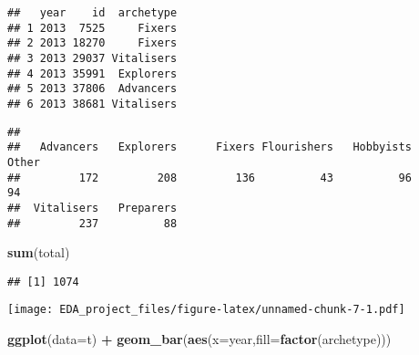 \documentclass[]{article}
\newenvironment{Shaded}{\begin{snugshade}}{\end{snugshade}}
\newcommand{\KeywordTok}[1]{\textcolor[rgb]{0.13,0.29,0.53}{\textbf{#1}}}
\newcommand{\DataTypeTok}[1]{\textcolor[rgb]{0.13,0.29,0.53}{#1}}
\newcommand{\StringTok}[1]{\textcolor[rgb]{0.31,0.60,0.02}{#1}}
\newcommand{\OperatorTok}[1]{\textcolor[rgb]{0.81,0.36,0.00}{\textbf{#1}}}
\newcommand{\NormalTok}[1]{#1}
\begin{document}
\begin{verbatim}
##   year    id  archetype
## 1 2013  7525     Fixers
## 2 2013 18270     Fixers
## 3 2013 29037 Vitalisers
## 4 2013 35991  Explorers
## 5 2013 37806  Advancers
## 6 2013 38681 Vitalisers
\end{verbatim}

\begin{Shaded}
\end{Shaded}

\begin{verbatim}
## 
##   Advancers   Explorers      Fixers Flourishers   Hobbyists       Other 
##         172         208         136          43          96          94 
##  Vitalisers   Preparers 
##         237          88
\end{verbatim}

\begin{Shaded}
\begin{Highlighting}[]
\KeywordTok{sum}\NormalTok{(total)}
\end{Highlighting}
\end{Shaded}

\begin{verbatim}
## [1] 1074
\end{verbatim}

\begin{Shaded}
\end{Shaded}

\texttt{[image: EDA\_project\_files/figure-latex/unnamed-chunk-7-1.pdf]}

\begin{Shaded}
\begin{Highlighting}[]
\KeywordTok{ggplot}\NormalTok{(}\DataTypeTok{data=}\NormalTok{t) }\OperatorTok{+}\StringTok{ }\KeywordTok{geom_bar}\NormalTok{(}\KeywordTok{aes}\NormalTok{(}\DataTypeTok{x=}\NormalTok{year,}\DataTypeTok{fill=}\KeywordTok{factor}\NormalTok{(archetype)))}
\end{Highlighting}
\end{Shaded}
\end{document}
